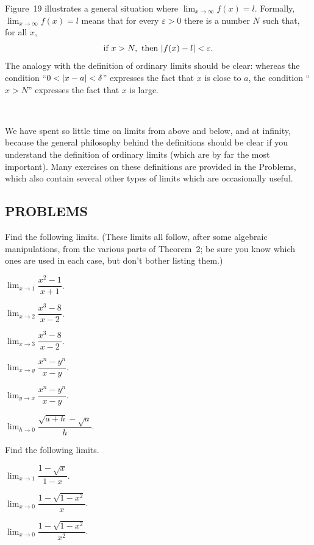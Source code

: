 Figure~19 illustrates a general situation where $\lim_{x\to\infty}f(x)=l$.
Formally, $\lim_{x\to\infty}f(x)=l$ means that for every $\varepsilon>0$ there
is a number $N$ such that, for all $x$,
\[
\text{if }x>N,\text{ then }\lvert f(x)-l\rvert<\varepsilon.
\]
The analogy with the definition of ordinary limits should be clear: whereas
the condition ``$0<\lvert x-a\rvert<\delta$'' expresses the fact that $x$ is close to
$a$, the condition ``$x>N$'' expresses the fact that $x$ is large.

\begin{center}
\\[0.6em]
\end{center}
We have spent so little time on limits from above and below, and at infinity,
because the general philosophy behind the definitions should be clear if you
understand the definition of ordinary limits (which are by far the most
important). Many exercises on these definitions are provided in the Problems,
which also contain several other types of limits which are occasionally
useful.

\subsection*{PROBLEMS}

Find the following limits. (These limits all follow, after some algebraic
manipulations, from the various parts of Theorem~2; be sure you know which
ones are used in each case, but don't bother listing them.)
\begin{romans}
\item $\displaystyle\lim_{x\to 1}\dfrac{x^2-1}{x+1}$.
\item $\displaystyle\lim_{x\to 2}\dfrac{x^3-8}{x-2}$.
\item $\displaystyle\lim_{x\to 3}\dfrac{x^3-8}{x-2}$.
\item $\displaystyle\lim_{x\to y}\dfrac{x^n-y^n}{x-y}$.
\item $\displaystyle\lim_{y\to x}\dfrac{x^n-y^n}{x-y}$.
\item $\displaystyle\lim_{h\to 0}\dfrac{\sqrt{a+h}-\sqrt{a}}{h}$.
\end{romans}

Find the following limits.
\begin{romans}
\item $\displaystyle\lim_{x\to 1}\dfrac{1-\sqrt{x}}{1-x}$.
\item $\displaystyle\lim_{x\to 0}\dfrac{1-\sqrt{1-x^2}}{x}$.
\item $\displaystyle\lim_{x\to 0}\dfrac{1-\sqrt{1-x^2}}{x^2}$.
\end{romans}

